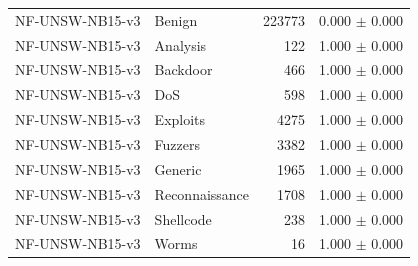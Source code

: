 \begin{tabular}{llrl}
NF-UNSW-NB15-v3 & Benign & 223773 & 0.000 $\pm$ 0.000 \\
NF-UNSW-NB15-v3 & Analysis & 122 & 1.000 $\pm$ 0.000 \\
NF-UNSW-NB15-v3 & Backdoor & 466 & 1.000 $\pm$ 0.000 \\
NF-UNSW-NB15-v3 & DoS & 598 & 1.000 $\pm$ 0.000 \\
NF-UNSW-NB15-v3 & Exploits & 4275 & 1.000 $\pm$ 0.000 \\
NF-UNSW-NB15-v3 & Fuzzers & 3382 & 1.000 $\pm$ 0.000 \\
NF-UNSW-NB15-v3 & Generic & 1965 & 1.000 $\pm$ 0.000 \\
NF-UNSW-NB15-v3 & Reconnaissance & 1708 & 1.000 $\pm$ 0.000 \\
NF-UNSW-NB15-v3 & Shellcode & 238 & 1.000 $\pm$ 0.000 \\
NF-UNSW-NB15-v3 & Worms & 16 & 1.000 $\pm$ 0.000 \\
\bottomrule
\end{tabular}
